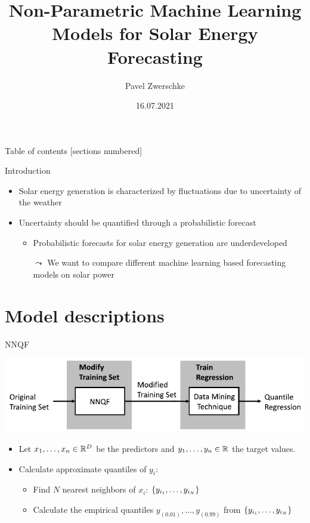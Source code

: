 \documentclass[10pt,aspectratio=169]{beamer}
\title{Non-Parametric Machine Learning Models for Solar Energy Forecasting}
\date{16.07.2021}
\author{Pavel Zwerschke}
\institute{Karlsruhe Institute of Technology}
\begin{document}
\maketitle

\begin{frame}{Table of contents}
    [sections numbered]
    \tableofcontents%
\end{frame}

\begin{frame}{Introduction}
    \begin{itemize}
        \item Solar energy generation is characterized by fluctuations due to uncertainty of the weather
        \item Uncertainty should be quantified through a probabilistic forecast
        \begin{itemize}
            \item Probabilistic forecasts for solar energy generation are underdeveloped
            \item[\(\leadsto\)] We want to compare different machine learning based forecasting models on solar power
        \end{itemize}
    \end{itemize}
\end{frame}

\section{Model descriptions}

\begin{frame}{NNQF}
    \begin{center}
        \includegraphics{plots/nnqf_approach.pdf}
    \end{center}
    \begin{itemize}
        \item Let \(x_1, \ldots, x_n \in \mathbb{R}^D\) be the predictors and \(y_1, \ldots, y_n\in \mathbb{R}\) the target values.
        \item Calculate approximate quantiles of \(y_i\):
        \begin{itemize}
            \item Find \(N\) nearest neighbors of \(x_i\): \(\{y_{i_1}, \ldots, y_{i_N}\}\)
            \item Calculate the empirical quantiles \(y_{(0.01)}, \ldots, y_{(0.99)}\) from \(\{y_{i_1}, \ldots, y_{i_N}\}\)
        \end{itemize}
    \end{itemize}
\end{frame}
\end{document}
